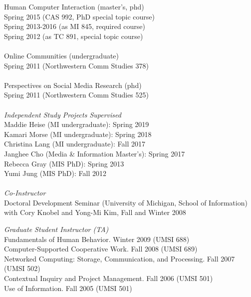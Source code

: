 \documentclass[9pt]{extarticle}
\begin{document}
\begin{tabbing}
Human Computer Interaction (master's, phd) \\
\hspace{0.5cm} Spring 2015 (CAS 992, PhD special topic course) \\
\hspace{0.5cm} Spring 2013-2016 (as MI 845, required course) \\
\hspace{0.5cm} Spring 2012 (as TC 891, special topic course) \\\\

Online Communities (undergraduate) \\
\hspace{0.5cm} Spring 2011 (Northwestern Comm Studies 378) \\\\

Perspectives on Social Media Research (phd)\\
\hspace{0.5cm} Spring 2011 (Northwestern Comm Studies 525) \\\\ %

\emph{Independent Study Projects Supervised} \\[1pt]
Maddie Heise (MI undergraduate): Spring 2019 \\
Kamari Morse (MI undergraduate): Spring 2018 \\
Christina Lang (MI undergraduate): Fall 2017 \\
Janghee Cho (Media \& Information Master's): Spring 2017 \\
Rebecca Gray (MIS PhD): Spring 2013 \\
Yumi Jung (MIS PhD): Fall 2012 \\\\

\emph{Co-Instructor} \\[1pt]
Doctoral Development Seminar (University of Michigan, School of Information) \\
\hspace{0.5cm} with Cory Knobel and Yong-Mi Kim, Fall and Winter 2008 
\end{tabbing}

\begin{tabbing}
\emph{Graduate Student Instructor (TA)} \\
Fundamentals of Human Behavior. Winter 2009 (UMSI 688) \\
Computer-Supported Cooperative Work. Fall 2008 (UMSI 689) \\ 
Networked Computing: Storage, Communication, and Processing. Fall 2007 (UMSI 502) \\
Contextual Inquiry and Project Management. Fall 2006 (UMSI 501) \\
Use of Information. Fall 2005 (UMSI 501) 
\end{tabbing}
\end{document}
